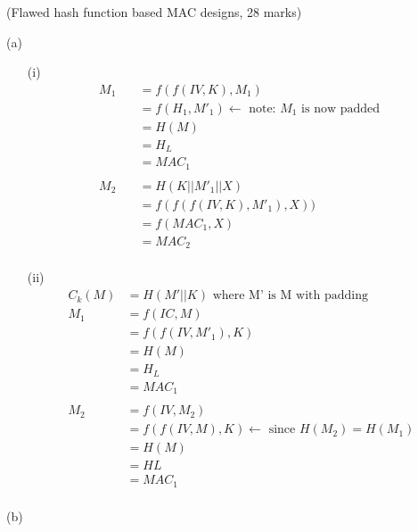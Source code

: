 \documentclass{assignment}
\begin{document}
\begin{flushleft}
\begin{problemlist}
\pbitem (Flawed hash function based MAC designs, 28 marks)
\item[(a)] \hspace{1cm}\\
\begin{enumerate}
\item[(i)]\hspace{1cm}\\
\begin{align*}
M_1 &= f(f(IV,K),M_1)\\
&= f(H_1,M'_1) \leftarrow \text{ note: } M_1 \text{ is now padded } \\
&= H(M)\\
&= H_L\\
&= MAC_1\\
\hspace{1cm}\\
M_2 &= H(K||M'_1||X)\\
&= f(f(f(IV,K),M'_1),X))\\
&= f(MAC_{1},X)\\
&= MAC_{2}\\
\end{align*}
\item[(ii)]\hspace{1cm}\\
\begin{align*}
C_k(M) &= H(M'||K) \text{ where M' is M with padding}\\
M_1 &= f(IC,M)\\
&= f(f(IV,M'_1),K)\\
&= H(M)\\
&= H_L\\
&= MAC_1\\
\hspace{1cm}\\
M_2 &= f(IV,M_2) \\
&= f(f(IV,M),K) \leftarrow \text{ since } H(M_2) = H(M_1) \\
&= H(M)\\
&= HL\\
&= MAC_1\\  
\end{align*}
\end{enumerate}
\newpage
\item[(b)]\hspace{1cm}\\
\begin{enumerate}

\end{enumerate}
\end{problemlist}
\end{flushleft}
\end{document}
